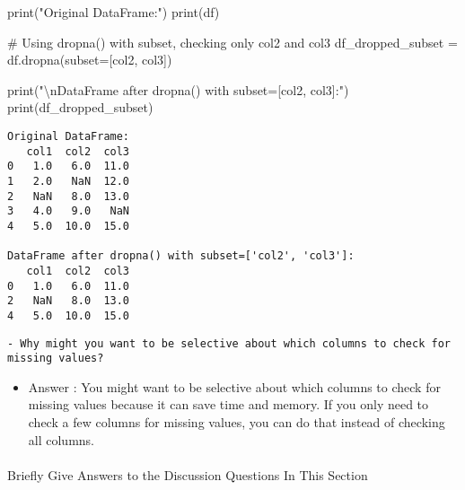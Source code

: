 \documentclass[
  letterpaper,
  DIV=11,
  numbers=noendperiod]{scrartcl}
\makeatletter
\let\oldparagraph\paragraph
\renewcommand{\paragraph}{
    \@ifstar
      \xxxParagraphStar
      \xxxParagraphNoStar
  }
\newcommand{\xxxParagraphStar}[1]{\oldparagraph*{#1}\mbox{}}
\newcommand{\xxxParagraphNoStar}[1]{\oldparagraph{#1}\mbox{}}
\newenvironment{Shaded}{\begin{snugshade}}{\end{snugshade}}
\newcommand{\BuiltInTok}[1]{\textcolor[rgb]{0.00,0.23,0.31}{#1}}
\newcommand{\CharTok}[1]{\textcolor[rgb]{0.13,0.47,0.30}{#1}}
\newcommand{\CommentTok}[1]{\textcolor[rgb]{0.37,0.37,0.37}{#1}}
\newcommand{\NormalTok}[1]{\textcolor[rgb]{0.00,0.23,0.31}{#1}}
\newcommand{\OperatorTok}[1]{\textcolor[rgb]{0.37,0.37,0.37}{#1}}
\newcommand{\StringTok}[1]{\textcolor[rgb]{0.13,0.47,0.30}{#1}}
\providecommand{\tightlist}{%
  \setlength{\itemsep}{0pt}\setlength{\parskip}{0pt}}
\makeatother
\begin{document}
\begin{tcolorbox}
\begin{Shaded}
\begin{Highlighting}[]
\BuiltInTok{print}\NormalTok{(}\StringTok{"Original DataFrame:"}\NormalTok{)}
\BuiltInTok{print}\NormalTok{(df)}

\CommentTok{\# Using dropna() with subset, checking only \textquotesingle{}col2\textquotesingle{} and \textquotesingle{}col3\textquotesingle{}}
\NormalTok{df\_dropped\_subset }\OperatorTok{=}\NormalTok{ df.dropna(subset}\OperatorTok{=}\NormalTok{[}\StringTok{\textquotesingle{}col2\textquotesingle{}}\NormalTok{, }\StringTok{\textquotesingle{}col3\textquotesingle{}}\NormalTok{])}

\BuiltInTok{print}\NormalTok{(}\StringTok{"}\CharTok{\textbackslash{}n}\StringTok{DataFrame after dropna() with subset=[\textquotesingle{}col2\textquotesingle{}, \textquotesingle{}col3\textquotesingle{}]:"}\NormalTok{)}
\BuiltInTok{print}\NormalTok{(df\_dropped\_subset)}
\end{Highlighting}
\end{Shaded}

\begin{verbatim}
Original DataFrame:
   col1  col2  col3
0   1.0   6.0  11.0
1   2.0   NaN  12.0
2   NaN   8.0  13.0
3   4.0   9.0   NaN
4   5.0  10.0  15.0

DataFrame after dropna() with subset=['col2', 'col3']:
   col1  col2  col3
0   1.0   6.0  11.0
2   NaN   8.0  13.0
4   5.0  10.0  15.0
\end{verbatim}

\begin{verbatim}
- Why might you want to be selective about which columns to check for missing values?
\end{verbatim}

\begin{itemize}
\tightlist
\item
  Answer : You might want to be selective about which columns to check
  for missing values because it can save time and memory. If you only
  need to check a few columns for missing values, you can do that
  instead of checking all columns.
\end{itemize}

\end{tcolorbox}

\paragraph{Briefly Give Answers to the Discussion Questions In This
Section}\label{briefly-give-answers-to-the-discussion-questions-in-this-section-2}
\end{document}
